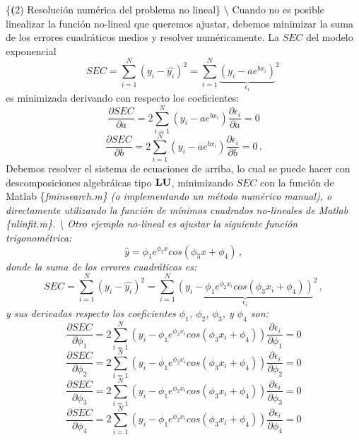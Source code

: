 \documentclass[
]{agujournal2019}
\begin{document}
\{\noindent   \textbf  (2) Resolución numérica del problema no lineal\}
\textbackslash{} Cuando no es posible linealizar la función no-lineal
que queremos ajustar, debemos minimizar la suma de los errores
cuadráticos medios y resolver numéricamente. La \(SEC\) del modelo
exponencial
\[SEC=\sum\limits^N_{i=1}(y_i-\hat{y_i})^2=\sum\limits^N_{i=1}
              {\underbrace{\left(y_i - a e^{bx_i}\right)}_{\epsilon_i}}^2\,\]
es minimizada derivando con respecto los coeficientes:
\[\frac{\partial{SEC}}{\partial{a}}=
      2\sum\limits^N_{i=1}\left(y_i - a e^{bx_i}\right)\frac{\partial{\epsilon_i}}{\partial{a}}=0\]
\[\frac{\partial{SEC}}{\partial{b}}=
     2\sum\limits^N_{i=1}\left(y_i - a e^{bx_i}\right)\frac{\partial{\epsilon_i}}{\partial{b}}=0\,.\]
Debemos resolver el sistema de ecuaciones de arriba, lo cual se puede
hacer con descomposiciones algebráicas tipo \({\textbf L}{\textbf U}\),
minimizando \(SEC\) con la función de Matlab \{\it fminsearch.m\} (o
implementando un método numérico manual), o directamente utilizando la
función de mínimos cuadrados no-lineales de Matlab \{\it nlinfit.m\}.
\textbackslash{} Otro ejemplo no-lineal es ajustar la siguiente función
trigonométrica:
\[\hat{y}=\phi_1 e^{\phi_2 x} cos(\phi_3 x + \phi_4)\,,\] donde la suma
de los errores cuadráticos es:
\[SEC=\sum\limits^N_{i=1}(y_i-\hat{y_i})^2=\sum\limits^N_{i=1}
              {\underbrace{\left(y_i - \phi_1 e^{\phi_2 x_i} cos(\phi_3 x_i + \phi_4)\right)}_{\epsilon_i}}^2\,,\]
y sus derivadas respecto los coeficientes \(\phi_1\), \(\phi_2\),
\(\phi_3\), y \(\phi_4\) son: \[\frac{\partial{SEC}}{\partial{\phi_1}}=
     2\sum\limits^N_{i=1}\left(y_i - \phi_1 e^{\phi_2 x_i} cos(\phi_3 x_i + \phi_4)\right)
     \frac{\partial{\epsilon_i}}{\partial{\phi_1}}=0\]
\[\frac{\partial{SEC}}{\partial{\phi_2}}=
    2\sum\limits^N_{i=1}\left(y_i - \phi_1 e^{\phi_2 x_i} cos(\phi_3 x_i + \phi_4)\right)
    \frac{\partial{\epsilon_i}}{\partial{\phi_2}}=0\]
\[\frac{\partial{SEC}}{\partial{\phi_3}}=
    2\sum\limits^N_{i=1}\left(y_i - \phi_1 e^{\phi_2 x_i} cos(\phi_3 x_i + \phi_4)\right)
    \frac{\partial{\epsilon_i}}{\partial{\phi_3}}=0\]
\[\frac{\partial{SEC}}{\partial{\phi_4}}=
    2\sum\limits^N_{i=1}\left(y_i - \phi_1 e^{\phi_2 x_i} cos(\phi_3 x_i + \phi_4)\right)
    \frac{\partial{\epsilon_i}}{\partial{\phi_4}}=0\]

\vspace{0.5cm}
\end{document}
